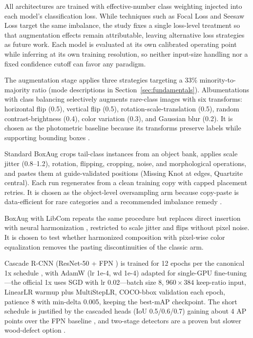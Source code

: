 \documentclass[pdflatex,sn-basic,Numbered,iicol]{sn-jnl}
\begin{document}
All architectures are trained with effective-number class weighting \citep{cui2019classbalanced} injected into each model's classification loss. While techniques such as Focal Loss \citep{lin2017focal} and Seesaw Loss \citep{wang2021seesaw} target the same imbalance, the study fixes a single loss-level treatment so that augmentation effects remain attributable, leaving alternative loss strategies as future work. Each model is evaluated at its own calibrated operating point while inferring at its own training resolution, so neither input-size handling nor a fixed confidence cutoff can favor any paradigm.

The augmentation stage applies three strategies targeting a 33\% minority-to-majority ratio (mode descriptions in Section~\ref{sec:fundamentals}). Albumentations with class balancing selectively augments rare-class images with six transforms: horizontal flip (0.5), vertical flip (0.5), rotation-scale-translation (0.5), random contrast-brightness (0.4), color variation (0.3), and Gaussian blur (0.2). It is chosen as the photometric baseline because its transforms preserve labels while supporting bounding boxes \citep{buslaev2020albumentations}.

Standard BoxAug crops tail-class instances from an object bank, applies scale jitter (0.8--1.2), rotation, flipping, cropping, noise, and morphological operations, and pastes them at guide-validated positions (Missing Knot at edges, Quartzite central). Each run regenerates from a clean training copy with capped placement retries. It is chosen as the object-level oversampling arm because copy-paste is data-efficient for rare categories \citep{ghiasi2021simple} and a recommended imbalance remedy \citep{shorten2019augmentation}.

BoxAug with LibCom repeats the same procedure but replaces direct insertion with neural harmonization \citep{cong2021bargainnet}, restricted to scale jitter and flips without pixel noise. It is chosen to test whether harmonized composition with pixel-wise color equalization \citep{Guerreiro_2023_CVPR} removes the pasting discontinuities of the classic arm.

Cascade R-CNN (ResNet-50 + FPN \citep{cai2018cascade}) is trained for 12 epochs per the canonical 1x schedule \citep{he2019rethinking}, with AdamW (lr 1e-4, wd 1e-4) adapted for single-GPU fine-tuning---the official 1x uses SGD with lr 0.02---batch size 8, $960\times 384$ keep-ratio input, LinearLR warmup plus MultiStepLR, COCO-bbox validation each epoch, patience 8 with min-delta 0.005, keeping the best-mAP checkpoint. The short schedule is justified by the cascaded heads (IoU 0.5/0.6/0.7) gaining about 4 AP points over the FPN baseline \citep{cai2018cascade}, and two-stage detectors are a proven but slower wood-defect option \citep{cwbyolo2024}.
\end{document}

